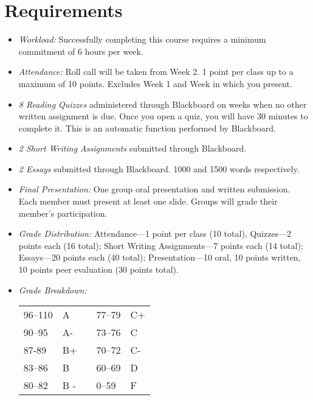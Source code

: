 \documentclass[11pt,article,oneside]{memoir}
\begin{document}
\section{Requirements}

\begin{itemize}
\item \textit{Workload:} Successfully completing this course requires a minimum commitment of 6 hours per week. 

\item \textit{Attendance:} Roll call will be taken from Week 2. 1 point per class up to a maximum of 10 points. Excludes Week 1 and Week in which you present.

\item \textit{8 Reading Quizzes} administered through Blackboard on weeks when no other written assignment is due. Once you open a quiz, you will have 30 minutes to complete it. This is an automatic function performed by Blackboard. 

\item \textit{2 Short Writing Assignments} submitted through Blackboard. 

\item \textit{2 Essays} submitted through Blackboard. 1000 and 1500 words respectively.

\item \textit{Final Presentation:} One group oral presentation and written submission. Each member must present at least one slide. Groups will grade their member's participation. 

\item \textit{Grade Distribution:}  Attendance---1 point per class (10 total), Quizzes---2 points each (16 total);  Short Writing Assignments---7 points each (14 total); Essays---20 points each (40 total); Presentation---10 oral, 10 points written, 10 points peer evaluation (30 points total).

\item \textit{Grade Breakdown:}

 \begin{tabular}{ | l | l | p{2cm} | l | l | }
    \hline 
96--110 & A  & &  77--79 &  C+ \\  
90--95 & A- & &  73--76 & C \\
87-89 & B+ &  &  70--72 & C- \\ 
83--86 & B  & &  60--69 & D\\
80--82 & B - & & 0--59 & F\\ \hline
    \end{tabular}


\end{itemize}
\end{document}
